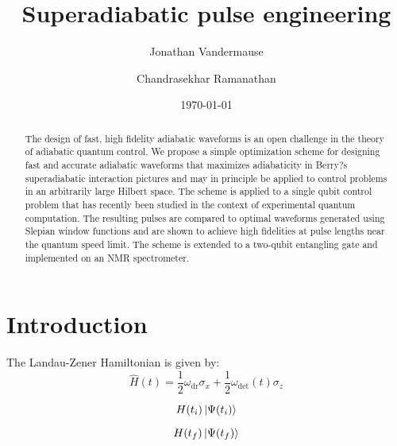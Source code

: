\documentclass[twocolumn,
 amsmath,amssymb,
 aps,
 prl
]{revtex4-1}
\begin{document}
\title{Superadiabatic pulse engineering}
\author{Jonathan Vandermause}
\author{Chandrasekhar Ramanathan}
\date{\today}

\begin{abstract}
The design of fast, high fidelity adiabatic waveforms is an open challenge in the theory of adiabatic quantum control. We propose a simple optimization scheme for designing fast and accurate adiabatic waveforms that maximizes adiabaticity in Berry?s superadiabatic interaction pictures and may in principle be applied to control problems in an arbitrarily large Hilbert space. The scheme is applied to a single qubit control problem that has recently been studied in the context of experimental quantum computation. The resulting pulses are compared to optimal waveforms generated using Slepian window functions and are shown to achieve high fidelities at pulse lengths near the quantum speed limit. The scheme is extended to a two-qubit entangling gate and implemented on an NMR spectrometer.\end{abstract}

\maketitle

\section{Introduction} 
\vspace*{-0.15in}
The Landau-Zener Hamiltonian is given by:
\begin{equation}
\hat{H}(t) = \frac{1}{2}\omega_{\text{dr}} \sigma_x +\frac{1}{2}\omega_{\text{det}}(t) \sigma_z
\end{equation}

\begin{equation}
H(t_i)\ket{\Psi(t_i)}
\end{equation}

\begin{equation}
H(t_f)\ket{\Psi(t_f)}
\end{equation}
\end{document}
